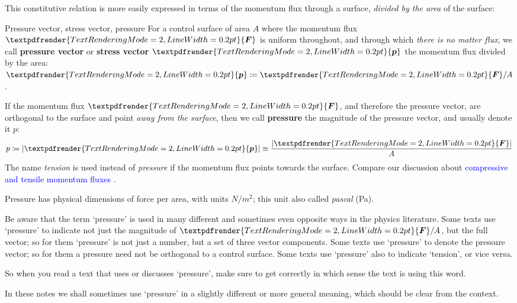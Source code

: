 \documentclass[a4paper,12pt,%
onecolumn,oneside,%
british%
]{memoir}
\renewcommand*{\bm}[1]{\textpdfrender{TextRenderingMode=2,LineWidth=0.2pt}{\boldsymbol{#1}}}
\newcommand*{\defd}{\coloneqq}
\DeclarePairedDelimiter\abs{\lvert}{\rvert}
\renewcommand*{\|}[1][]{\nonscript\:#1\vert\nonscript\:\mathopen{}}
\newcommand*{\sect}{\S}%
\renewcommand*{\autoref}[3][\sect\,\ref]{\textcolor{blue}{#3}
\raisebox{0.6ex}{\color{blue}\miniscule%
\faIcon{angle-right}%
\;#1{#2}\;p.\,\pageref{#2}}}
\newcommand*{\yF}{\bm{F}}
\newcommand*{\ypr}{p} %
\newcommand*{\ypv}{\bm{\ypr}} %
\begin{document}
This constitutive relation is more easily expressed in terms of the momentum flux through a surface, \emph{divided by the area} of the surface:
\begin{definition}{{Pressure vector, stress vector, pressure}}
  For a control surface of area $A$ where the momentum flux $\yF$ is uniform throughout, and through which \emph{there is no matter flux}, we call \textbf{pressure vector} or \textbf{stress vector} $\ypv$ the momentum flux divided by the area: $\ypv \defd \yF/A$.

  \medskip

If the momentum flux $\yF$, and therefore the pressure vector, are orthogonal to the surface and point \emph{away from the surface}, then we call \textbf{pressure} the magnitude of the pressure vector, and usually denote it $\ypr$:
\begin{equation}
  \label{eq:pressure_def}
  \ypr \defd \abs{\ypv} \equiv \frac{\abs{\yF}}{A}
\end{equation}
The name \emph{tension} is used instead of \emph{pressure} if the momentum flux points towards the surface. Compare our discussion about \autoref{sec:pressure_tension_shear}{compressive and tensile momentum fluxes}.

\medskip

Pressure has physical dimensions of force per area, with units $\unit{N/m^{2}}$; this unit also called \emph{pascal} (\unit{Pa}).
\end{definition}

\begin{warning}
  Be aware that the term \enquote*{pressure} is used in many different and sometimes even opposite ways in the physics literature. Some texts use \enquote*{pressure} to indicate not just the magnitude of $\yF/A$, but the full vector; so for them \enquote*{pressure} is not just a number, but a set of three vector components. Some texts use \enquote*{pressure} to denote the pressure vector; so for them a pressure need not be orthogonal to a control surface. Some texts use \enquote*{pressure} also to indicate \enquote*{tension}, or vice versa.

  So when you read a text that uses or discusses \enquote*{pressure}, make sure to get correctly in which sense the text is using this word.

  In these notes we shall sometimes use \enquote*{pressure} in a slightly different or more general meaning, which should be clear from the context.
\end{warning}
\end{document}
